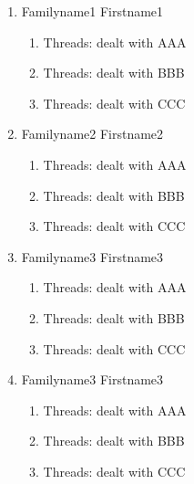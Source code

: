 \documentclass[a4paper,12pt]{report}
\begin{document}
\begin{enumerate}
	\item Familyname1 Firstname1
	    \begin{enumerate}
	     \item Threads: dealt with AAA
	     \item Threads: dealt with BBB
	     \item Threads: dealt with CCC
	    \end{enumerate}

	\item Familyname2 Firstname2
	    \begin{enumerate}
	     \item Threads: dealt with AAA
	     \item Threads: dealt with BBB
	     \item Threads: dealt with CCC
	    \end{enumerate}
	    
	\item Familyname3 Firstname3
	    \begin{enumerate}
	     \item Threads: dealt with AAA
	     \item Threads: dealt with BBB
	     \item Threads: dealt with CCC
	    \end{enumerate}

	\item Familyname3 Firstname3
	    \begin{enumerate}
	     \item Threads: dealt with AAA
	     \item Threads: dealt with BBB
	     \item Threads: dealt with CCC
	    \end{enumerate}
	   
\end{enumerate}











\end{document}
